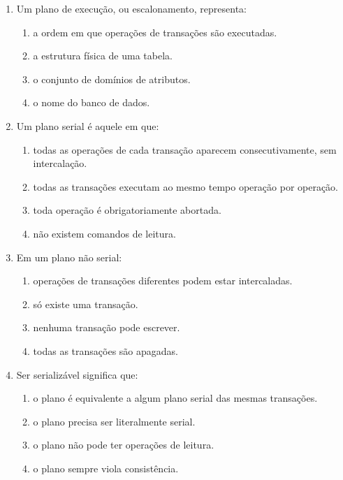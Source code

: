 \documentclass[12pt,a4paper]{article}
\begin{document}
\begin{enumerate}[label=\textbf{Q\arabic*.}]
\item Um plano de execução, ou escalonamento, representa:

\begin{enumerate}[label=\alph*)]
    \item a ordem em que operações de transações são executadas.
    \item a estrutura física de uma tabela.
    \item o conjunto de domínios de atributos.
    \item o nome do banco de dados.
\end{enumerate}

\item Um plano serial é aquele em que:

\begin{enumerate}[label=\alph*)]
    \item todas as operações de cada transação aparecem consecutivamente, sem intercalação.
    \item todas as transações executam ao mesmo tempo operação por operação.
    \item toda operação é obrigatoriamente abortada.
    \item não existem comandos de leitura.
\end{enumerate}

\item Em um plano não serial:

\begin{enumerate}[label=\alph*)]
    \item operações de transações diferentes podem estar intercaladas.
    \item só existe uma transação.
    \item nenhuma transação pode escrever.
    \item todas as transações são apagadas.
\end{enumerate}

\item Ser serializável significa que:

\begin{enumerate}[label=\alph*)]
    \item o plano é equivalente a algum plano serial das mesmas transações.
    \item o plano precisa ser literalmente serial.
    \item o plano não pode ter operações de leitura.
    \item o plano sempre viola consistência.
\end{enumerate}


\end{enumerate}
\end{document}
